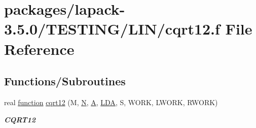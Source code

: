 \hypertarget{cqrt12_8f}{}\section{packages/lapack-\/3.5.0/\+T\+E\+S\+T\+I\+N\+G/\+L\+I\+N/cqrt12.f File Reference}
\label{cqrt12_8f}
\subsection*{Functions/\+Subroutines}
\begin{DoxyCompactItemize}
\item 
real \hyperlink{afunc_8m_a7b5e596df91eadea6c537c0825e894a7}{function} \hyperlink{group__complex__lin_gaf19bfcc505b7305555dde48fb54a6365}{cqrt12} (M, \hyperlink{polmisc_8c_a0240ac851181b84ac374872dc5434ee4}{N}, \hyperlink{classA}{A}, \hyperlink{example__user_8c_ae946da542ce0db94dced19b2ecefd1aa}{L\+D\+A}, S, W\+O\+R\+K, L\+W\+O\+R\+K, R\+W\+O\+R\+K)
\begin{DoxyCompactList}\small\item\em {\bfseries C\+Q\+R\+T12} \end{DoxyCompactList}\end{DoxyCompactItemize}
